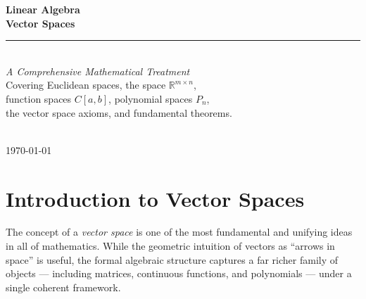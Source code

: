 \documentclass[12pt]{article}
\newcommand{\R}{\mathbb{R}}
\newcommand{\vv}[1]{\mathbf{#1}}
\begin{document}
	
	\begin{titlepage}
		\centering
		\vspace*{3cm}
		{\Huge\bfseries\color{axiomblue} Linear Algebra}\\[0.8em]
		{\huge\bfseries Vector Spaces}\\[2em]
		\rule{0.6\linewidth}{1.5pt}\\[2em]
		{\large\itshape A Comprehensive Mathematical Treatment}\\[1em]
		{\normalsize Covering Euclidean spaces, the space $\R^{m\times n}$,\\
			function spaces $C[a,b]$, polynomial spaces $P_n$,\\
			the vector space axioms, and fundamental theorems.}\\[4em]
		\\[2em]
		\vfill
		{\small\color{notegray}\today}
	\end{titlepage}

	\tableofcontents
	\newpage
	

	\section{Introduction to Vector Spaces}
	
	
	The concept of a \emph{vector space} is one of the most fundamental and unifying ideas
	in all of mathematics. While the geometric intuition of vectors as ``arrows in space''
	is useful, the formal algebraic structure captures a far richer family of objects
	--- including matrices, continuous functions, and polynomials --- under a single
	coherent framework.
	
\end{document}
